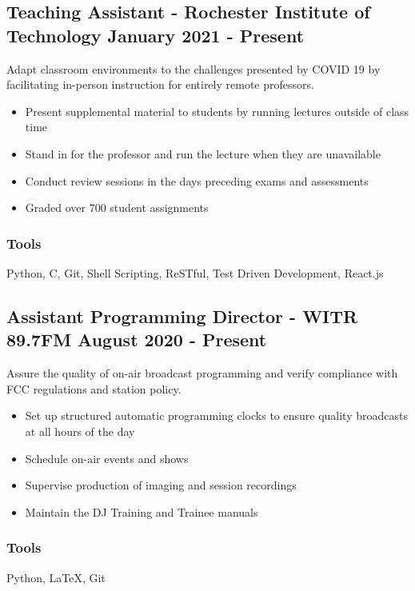 \documentclass[11pt, letterpaper]{article}
\begin{document}
        \subsection{Teaching Assistant - Rochester Institute of Technology \hfill January 2021 - Present}
            Adapt classroom environments to the challenges presented by COVID 19 by facilitating in-person
            instruction for entirely remote professors.
            \begin{itemize}[nosep]
                \item Present supplemental material to students by running lectures outside of
                        class time
                \item Stand in for the professor and run the lecture when they are unavailable
                \item Conduct review sessions in the days preceding exams and assessments
                \item Graded over 700 student assignments
            \end{itemize}
            \subsubsection{Tools}
                Python, C, Git, Shell Scripting, ReSTful, Test Driven Development, React.js
            \vspace{.5em}
        \subsection{Assistant Programming Director - WITR 89.7FM \hfill August 2020 - Present}
            Assure the quality of on-air broadcast programming and verify compliance with FCC
            regulations and station policy.
            \begin{itemize}[nosep]
                \item Set up structured automatic programming clocks to ensure quality broadcasts
                        at all hours of the day
                \item Schedule on-air events and shows
                \item Supervise production of imaging and session recordings
                \item Maintain the DJ Training and Trainee manuals
            \end{itemize}
            \subsubsection{Tools}
                Python, \LaTeX, Git
\end{document}
